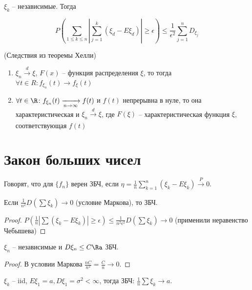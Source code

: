\begin{theorem}
$\xi_k$ -- независимые. Тогда

$$P(\sum\limits_{1\leq k \leq n} |\sum\limits_{j = 1}^k(\xi_d - E\xi_d)| \geq \epsilon) \leq \frac{1}{\epsilon^2}\sum\limits_{j=1}^n D_{\xi_j}$$
\end{theorem}

\begin{theorem} (Следствия из теоремы Хелли)

\begin{enumerate}

\item $\xi_n \xrightarrow[]{d} \xi$, $F(x)$ -- функция распределения $\xi$, то тогда $\forall t \in R \colon f_{\xi_n}(t) \to f_\xi(t)$
\item $\forall t \in \R \colon f_{\xi_n}(t) \xrightarrow[n \to \infty]{} f(t)$  и $f(t)$ непрерывна в нуле, 
то она характеристическая и $\xi_n \xrightarrow[]{d} \xi$, где $F(\xi)$ -- характеристическая функция $\xi$, соответствующая $f(t)$

\end{enumerate}


\end{theorem}
\section{Закон больших чисел}
\begin{Def}
Говорят, что для $\{f_n\}$ верен ЗБЧ, если $\eta = \frac1n \sum\limits_{k=1}^n (\xi_k - E\xi_k) \xrightarrow[]{P} 0$.
\end{Def}

\begin{theorem}[Марков]
Если $\frac{1}{n^2} D (\sum \xi_k) \to 0$ (условие Маркова), то ЗБЧ.
\end{theorem}
\begin{proof}
$P(\frac1n | \sum (\xi_k - E\xi_k) | \geq \epsilon) \leq \frac{1}{n^2 \epsilon^2} D(\sum \xi_k) \to 0$ (применили неравенство Чебышева)
\end{proof}

\begin{theorem}[Чебышев]
$\xi_n$ -- независимые и $D\xi_n \leq C \Ra$ ЗБЧ.
\end{theorem}
\begin{proof}
В условии Маркова $\frac{nC}{n^2} = \frac{C}{n} \to 0$.
\end{proof}

\begin{theorem}[Хинчин]
$\xi_k$ -- iid, $E\xi_1 = a, D\xi_1 = \sigma^2 < \infty$, тогда ЗБЧ: $\frac1n \sum \xi_k \to a$.
\end{theorem}


